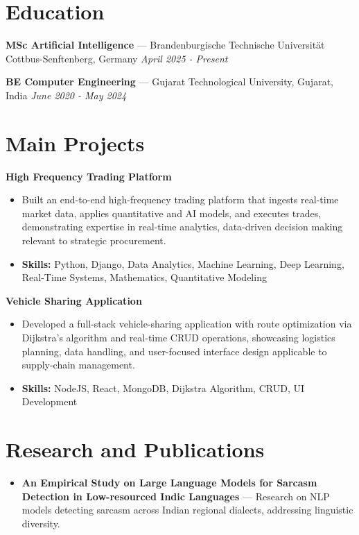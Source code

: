 \documentclass[a4paper,10pt]{article}
\begin{document}
\section*{Education}
\textbf{MSc Artificial Intelligence} — Brandenburgische Technische Universität Cottbus-Senftenberg, Germany \hfill \textit{April 2025 - Present}\par
\vspace{1.5pt}
\textbf{BE Computer Engineering} — Gujarat Technological University, Gujarat, India \hfill \textit{June 2020 - May 2024}\par

\section*{Main Projects}
\textbf{High Frequency Trading Platform}\par
\vspace{1pt}
\begin{itemize}
  \item Built an end-to-end high-frequency trading platform that ingests real-time market data, applies quantitative and AI models, and executes trades, demonstrating expertise in real-time analytics, data-driven decision making relevant to strategic procurement.
  \item \textbf{Skills:} Python, Django, Data Analytics, Machine Learning, Deep Learning, Real-Time Systems, Mathematics, Quantitative Modeling
\end{itemize}
\vspace{3pt}
\textbf{Vehicle Sharing Application}\par
\vspace{1pt}
\begin{itemize}
  \item Developed a full-stack vehicle-sharing application with route optimization via Dijkstra's algorithm and real-time CRUD operations, showcasing logistics planning, data handling, and user-focused interface design applicable to supply-chain management.
  \item \textbf{Skills:} NodeJS, React, MongoDB, Dijkstra Algorithm, CRUD, UI Development
\end{itemize}

\section*{Research and Publications}
\begin{itemize}
\item \textbf{An Empirical Study on Large Language Models for Sarcasm Detection in Low-resourced Indic Languages} — Research on NLP models detecting sarcasm across Indian regional dialects, addressing linguistic diversity.
\end{itemize}
\end{document}
